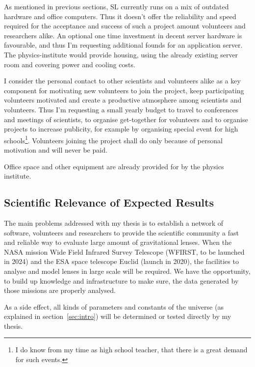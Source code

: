 \documentclass[11pt]{article}
\begin{document}
As mentioned in previous sections, SL currently runs on a mix of outdated hardware and office computers.
Thus it doesn't offer the reliability and speed required for the acceptance and success of such a project amount volunteers and researchers alike.
An optional one time investment in decent server hardware is favourable, and thus I'm requesting additional founds for an application server.
The physics-institute would provide housing, using the already existing server room and covering power and cooling costs.

I consider the personal contact to other scientists and volunteers alike as a key component for motivating new volunteers to join the project, keep participating volunteers motivated and create a productive atmosphere among scientists and volunteers.
Thus I'm requesting a small yearly budget to travel to conferences and meetings of scientists, to organise get-together for volunteers and to organise projects to increase publicity, for example by organising special event for high schools\footnote{I do know from my time as high school teacher, that there is a great demand for such events.}.
Volunteers joining the project shall do only because of personal motivation and will never be paid.

Office space and other equipment are already provided for by the physics institute.




\subsection{Scientific Relevance of Expected Results}

The main problems addressed with my thesis is to establish a network of software, volunteers and researchers to provide the scientific community a fast and reliable way to evaluate large amount of gravitational lenses.
When the NASA mission Wide Field Infrared Survey Telescope (WFIRST, to be launched in 2024) and the ESA space telescope Euclid (launch in 2020), the facilities to analyse and model lenses in large scale will be required.
We have the opportunity, to build up knowledge and infrastructure to make sure, the data generated by those missions are properly analysed.



As a side effect, all kinds of parameters and constants of the universe (as explained in section~\ref{sec:intro}) will be determined or tested directly by my thesis.


\newpage


\end{document}

